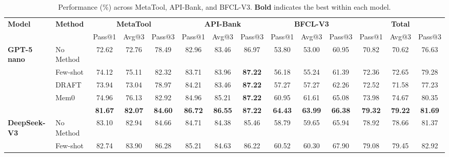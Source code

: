 \documentclass[11pt]{article}
\newcommand{\ours}{\texttt{ExpG}}
\begin{document}

\begin{table}[t]
    \caption{Performance (\%) across MetaTool, API-Bank, and BFCL-V3. \textbf{Bold} indicates the best within each model.}
    \centering
    \fontsize{8.2}{9.5}\selectfont
    \setlength{\tabcolsep}{1.7pt}
    \begin{tabular}{@{}ll*{12}{c}@{}}
    \toprule
         \multirow{2}{*}{\textbf{Model}} & \multirow{2}{*}{\textbf{Method}} &
         \multicolumn{3}{c}{\textbf{MetaTool}} &
         \multicolumn{3}{c}{\textbf{API-Bank}} &
         \multicolumn{3}{c}{\textbf{BFCL-V3}} &
         \multicolumn{3}{c}{\textbf{Total}} \\
         &  & Pass@1 & Avg@3 & Pass@3 & Pass@1 & Avg@3 & Pass@3 & Pass@1 & Avg@3 & Pass@3 & Pass@1 & Avg@3 & Pass@3 \\
    \midrule
    \multirow{5}{*}{\textbf{GPT-5 nano}}
        & No Method & 72.62 & 72.76 & 78.49 & 82.96 & 83.46 & 86.97 & 53.80 & 53.00 & 60.95 & 70.82 & 70.62 & 76.63 \\
        & Few-shot  & 74.12 & 75.11 & 82.32 & 83.71 & 83.96 & \textbf{87.22} & 56.18 & 55.24 & 61.39 & 72.36 & 72.65 & 79.28 \\
        & DRAFT     & 73.94 & 73.04 & 78.97 & 84.21 & 83.46 & \textbf{87.22} & 57.27 & 57.27 & 62.26 & 72.52 & 71.58 & 77.23 \\
        & Mem0      & 74.96 & 76.13 & 82.92 & 84.96 & 85.21 & \textbf{87.22} & 60.95 & 61.61 & 65.08 & 73.98 & 74.67 & 80.35 \\
        & \cellcolor{gray!15}{\ours} & \cellcolor{gray!15}\textbf{81.67} & \cellcolor{gray!15}\textbf{82.07} & \cellcolor{gray!15}\textbf{84.60} & \cellcolor{gray!15}\textbf{86.72} & \cellcolor{gray!15}\textbf{86.55} & \cellcolor{gray!15}\textbf{87.22} & \cellcolor{gray!15}\textbf{64.43} & \cellcolor{gray!15}\textbf{63.99} & \cellcolor{gray!15}\textbf{66.38} & \cellcolor{gray!15}\textbf{79.32} & \cellcolor{gray!15}\textbf{79.22} & \cellcolor{gray!15}\textbf{81.69} \\
    \midrule
    \multirow{5}{*}{\textbf{DeepSeek-V3}}
        & No Method & 83.10 & 82.94 & 84.66 & 84.71 & 84.38 & 85.46 & 58.79 & 59.65 & 65.94 & 78.92 & 78.66 & 81.37 \\
        & Few-shot  & 82.74 & 83.90 & 86.28 & 85.21 & 84.63 & 86.22 & 60.52 & 60.30 & 67.90 & 79.08 & 79.45 & 82.92 \\

\end{tabular}
\end{table}
\end{document}
